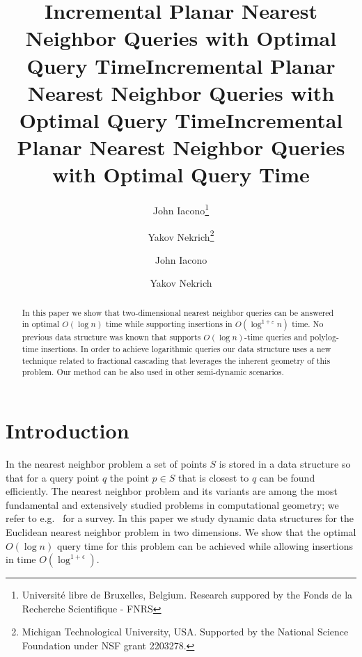 \documentclass[12pt,a4paper,USenglish,cleveref, autoref, thm-restate]{article}
\title{Incremental Planar Nearest Neighbor Queries with  Optimal Query Time}
\author{John Iacono\thanks{Universit\'{e} libre de Bruxelles, Belgium. Research suppored by the Fonds de la Recherche Scientifique - FNRS} \and Yakov Nekrich\thanks{Michigan Technological University, USA. Supported by the National Science Foundation under NSF grant 2203278.}}
\date{}
\title{Incremental Planar Nearest Neighbor Queries with  Optimal Query Time}
\author{John Iacono}{Universit\'{e} libre de Bruxelles, Belgium} {john@johniacono.com}{}{}%
\author{Yakov Nekrich}{Michigan Technological University, USA}{ yakov.nekrich@googlemail.com}{}{}
\title{Incremental Planar Nearest Neighbor Queries with  Optimal Query Time}
\newcommand{\eps}{\varepsilon}
\newcommand{\eps}{\varepsilon}
\newif\ifeurocg
\newcommand{\eps}{\varepsilon}
\begin{document}
\ifeurocg
\author[1]{John Iacono}
\affil[1]{Université libre de Bruxelles, Belgium}%

\author[2]{Yakov Nekrich}
\affil[2]{Michigan Technological University, USA}%

\ArticleNo{100}
\fi

\maketitle


\begin{abstract}
  In this paper we show that two-dimensional nearest neighbor queries can be answered in optimal $O(\log n)$ time while supporting insertions in $O(\log^{1+\eps}n)$ time.
No previous data structure was known that supports $O(\log n)$-time queries and polylog-time  insertions. 
In order to achieve logarithmic queries our data structure uses a new technique related to fractional cascading that leverages the inherent geometry of this problem. Our method can be also  used in other semi-dynamic scenarios. 
\end{abstract}




\section{Introduction}
\label{sec:intro}
In the nearest neighbor problem a set of points $S$ is stored in a data structure so that for a query point $q$ the point $p\in S$ that is closest to $q$ can be found efficiently. The nearest neighbor problem and its variants are among the most fundamental and extensively studied problems in computational geometry; we refer to e.g.~\cite{survey1} for a survey. In this paper we study dynamic data structures for the Euclidean nearest neighbor problem in two dimensions. We show that 
the optimal $O(\log n)$ query time for this problem can be achieved while allowing insertions in time $O(\log^{1+\epsilon})$. 
\end{document}
